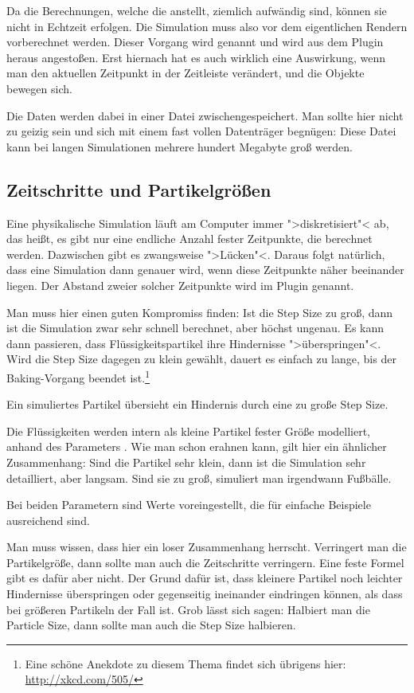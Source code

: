 \documentclass[10pt,DIV=14,a4paper]{scrartcl}
\begin{document}
Da die Berechnungen, welche die \fluidsim anstellt, ziemlich aufwändig
sind, können sie nicht in Echtzeit erfolgen. Die Simulation muss also
vor dem eigentlichen Rendern vorberechnet werden. Dieser Vorgang wird
 genannt und wird aus dem Plugin heraus angestoßen. Erst
hiernach hat es auch wirklich eine Auswirkung, wenn man den aktuellen
Zeitpunkt in der Zeitleiste verändert, und die Objekte bewegen sich.

Die Daten werden dabei in einer Datei zwischengespeichert. Man sollte
hier nicht zu geizig sein und sich mit einem fast vollen Datenträger
begnügen: Diese Datei kann bei langen Simulationen mehrere hundert
Megabyte groß werden.

\subsection{Zeitschritte und Partikelgrößen}
Eine physikalische Simulation läuft am Computer immer ">diskretisiert"<
ab, das heißt, es gibt nur eine endliche Anzahl fester Zeitpunkte, die
berechnet werden. Dazwischen gibt es zwangsweise ">Lücken"<. Daraus
folgt natürlich, dass eine Simulation dann genauer wird, wenn diese
Zeitpunkte näher beeinander liegen. Der Abstand zweier solcher
Zeitpunkte wird im Plugin  genannt.

Man muss hier einen guten Kompromiss finden: Ist die Step Size zu groß,
dann ist die Simulation zwar sehr schnell berechnet, aber höchst
ungenau. Es kann dann passieren, dass Flüssigkeitspartikel ihre
Hindernisse ">überspringen"<. Wird die Step Size dagegen zu klein
gewählt, dauert es einfach zu lange, bis der Baking-Vorgang beendet
ist.\footnote{Eine schöne Anekdote zu diesem Thema findet sich übrigens
hier: \url{http://xkcd.com/505/}}

{Ein simuliertes Partikel übersieht ein Hindernis durch eine zu große
Step Size.}

Die Flüssigkeiten werden intern als kleine Partikel fester Größe
modelliert, anhand des Parameters . Wie man schon
erahnen kann, gilt hier ein ähnlicher Zusammenhang: Sind die Partikel
sehr klein, dann ist die Simulation sehr detailliert, aber langsam. Sind
sie zu groß, simuliert man irgendwann Fußbälle.

Bei beiden Parametern sind Werte voreingestellt, die für einfache
Beispiele ausreichend sind.

Man muss wissen, dass hier ein loser Zusammenhang herrscht. Verringert
man die Partikelgröße, dann sollte man auch die Zeitschritte verringern.
Eine feste Formel gibt es dafür aber nicht. Der Grund dafür ist, dass
kleinere Partikel noch leichter Hindernisse überspringen oder
gegenseitig ineinander eindringen können, als dass bei größeren
Partikeln der Fall ist. Grob lässt sich sagen: Halbiert man die Particle
Size, dann sollte man auch die Step Size halbieren.
\end{document}
